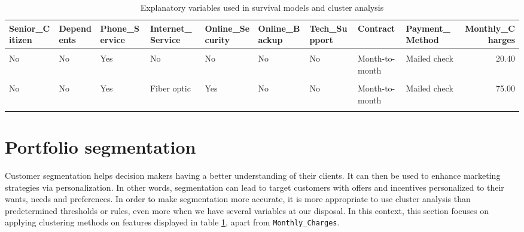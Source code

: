 \documentclass[
]{book}
\begin{document}
\begin{table}[H]

\caption{\label{tab:selectedfeatures}Explanatory variables used in survival models and cluster analysis}
\centering
\begin{tabular}[t]{lllllllllr}
\toprule
Senior\_Citizen & Dependents & Phone\_Service & Internet\_Service & Online\_Security & Online\_Backup & Tech\_Support & Contract & Payment\_Method & Monthly\_Charges\\
\midrule
\cellcolor{gray!6}{No} & \cellcolor{gray!6}{No} & \cellcolor{gray!6}{Yes} & \cellcolor{gray!6}{Fiber optic} & \cellcolor{gray!6}{No} & \cellcolor{gray!6}{No} & \cellcolor{gray!6}{No} & \cellcolor{gray!6}{Month-to-month} & \cellcolor{gray!6}{Electronic check} & \cellcolor{gray!6}{96.05}\\
No & No & Yes & No & No & No & No & Month-to-month & Mailed check & 20.40\\
\cellcolor{gray!6}{No} & \cellcolor{gray!6}{Yes} & \cellcolor{gray!6}{Yes} & \cellcolor{gray!6}{No} & \cellcolor{gray!6}{No} & \cellcolor{gray!6}{No} & \cellcolor{gray!6}{No} & \cellcolor{gray!6}{Two year} & \cellcolor{gray!6}{Mailed check} & \cellcolor{gray!6}{19.75}\\
No & No & Yes & Fiber optic & Yes & No & No & Month-to-month & Mailed check & 75.00\\
\cellcolor{gray!6}{No} & \cellcolor{gray!6}{No} & \cellcolor{gray!6}{Yes} & \cellcolor{gray!6}{Fiber optic} & \cellcolor{gray!6}{No} & \cellcolor{gray!6}{No} & \cellcolor{gray!6}{No} & \cellcolor{gray!6}{Month-to-month} & \cellcolor{gray!6}{Electronic check} & \cellcolor{gray!6}{80.85}\\
\bottomrule
\end{tabular}
\end{table}

\hypertarget{portfolio-segmentation}{%
\section{Portfolio segmentation}\label{portfolio-segmentation}}

Customer segmentation helps decision makers having a better understanding of their clients. It can then be used to enhance marketing strategies via personalization. In other words, segmentation can lead to target customers with offers and incentives personalized to their wants, needs and preferences. In order to make segmentation more accurate, it is more appropriate to use cluster analysis than predetermined thresholds or rules, even more when we have several variables at our disposal. In this context, this section focuses on applying clustering methods on features displayed in table \ref{tab:selectedfeatures}, apart from \texttt{Monthly\_Charges}.
\end{document}
